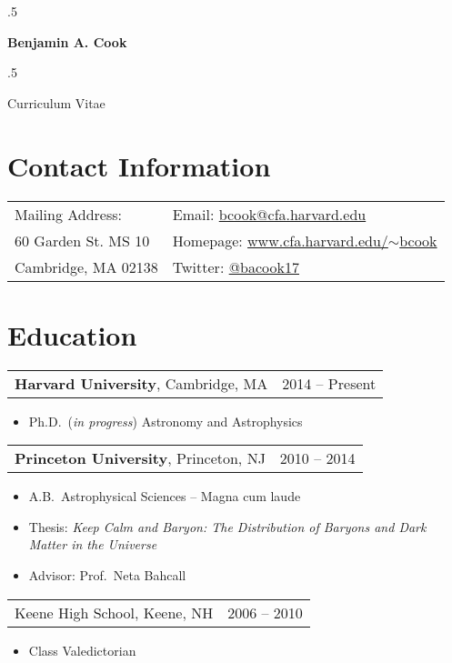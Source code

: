 \documentclass{res}
\newcommand\mancenter[1]{\moveleft.5\hoffset\centerline{#1}}
\begin{document}
  
\mancenter{\huge \bf{Benjamin A. Cook}}
\mancenter{\huge Curriculum Vitae} 

\begin{resume}                        

\section{\textbf{Contact Information}}
\vspace{.1in}
\begin{tabular}{@{}p{2.5in} p{2.5in}}
Mailing Address: & Email: \href{mailto:bcook@cfa.harvard.edu}{bcook@cfa.harvard.edu}\\
60 Garden St. MS 10 & Homepage:
\href{http://www.cfa.harvard.edu/~bcook}{www.cfa.harvard.edu/$\sim$bcook}\\
Cambridge, MA 02138 & Twitter: \href{https://twitter.com/bacook17}{@bacook17}\\
\end{tabular}


\section{\textbf{Education}}
\vspace{.1in}
\begin{tabular}{@{}p{4in} r@{}}
\textbf{Harvard University}, Cambridge, MA & 2014 -- Present
\end{tabular}
\begin{itemize} \itemsep -2pt
\item[] Ph.D.~(\textit{in progress}) Astronomy and Astrophysics
\end{itemize}

\begin{tabular}{@{}p{4in} r@{}}
\textbf{Princeton University}, Princeton, NJ & 2010 -- 2014
\end{tabular}
\begin{itemize} \itemsep -2pt
\item[] A.B.~Astrophysical Sciences -- Magna cum laude
\item[] Thesis: \textit{Keep Calm and Baryon: The Distribution of
  Baryons and Dark Matter in the Universe}
\item[] Advisor: Prof.~Neta Bahcall
\end{itemize}

\begin{tabular}{@{}p{4in} r@{}}
  Keene High School, Keene, NH & 2006 -- 2010
\end{tabular}
\begin{itemize} \itemsep -2pt
\item[] Class Valedictorian
\end{itemize}


\end{resume}
\end{document}
